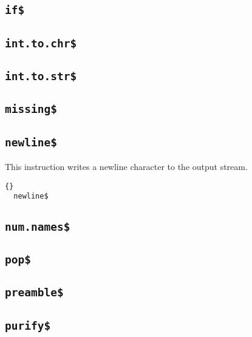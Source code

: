 \INCOMPLETE

\subsection{\texttt{if\$}}

\INCOMPLETE

\subsection{\texttt{int.to.chr\$}}

\INCOMPLETE

\subsection{\texttt{int.to.str\$}}

\INCOMPLETE

\subsection{\texttt{missing\$}}

\INCOMPLETE

\subsection{\texttt{newline\$}}

This instruction writes a newline character to the output stream.

\begin{lstlisting}{}
  newline$
\end{lstlisting}

\subsection{\texttt{num.names\$}}

\INCOMPLETE

\subsection{\texttt{pop\$}}

\INCOMPLETE

\subsection{\texttt{preamble\$}}

\INCOMPLETE

\subsection{\texttt{purify\$}}

